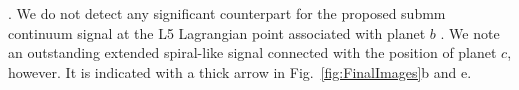\documentclass[longauth]{aa}
\begin{document}
\citep{Wang2021b}. 
We do not detect any significant counterpart for the proposed submm continuum signal at the L5 Lagrangian point associated with planet $b$ \citep{Balsalobre-Ruza2023}.
We note an outstanding extended spiral-like signal connected with the position of planet $c$, however. It is indicated with a thick arrow in Fig.~\ref{fig:FinalImages}b and e.
\end{document}
